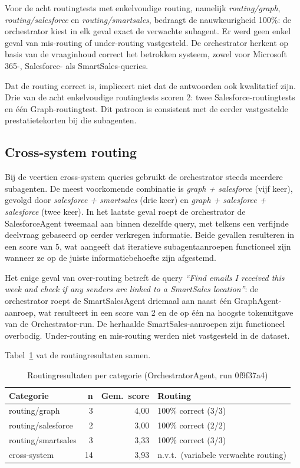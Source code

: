 Voor de acht routingtests met enkelvoudige routing, namelijk \textit{routing/graph}, \textit{routing/salesforce} en \textit{routing/smartsales}, bedraagt de nauwkeurigheid 100\%: de orchestrator kiest in elk geval exact de verwachte subagent. Er werd geen enkel geval van mis-routing of under-routing vastgesteld. De orchestrator herkent op basis van de vraaginhoud correct het betrokken systeem, zowel voor Microsoft 365-, Salesforce- als SmartSales-queries.

Dat de routing correct is, impliceert niet dat de antwoorden ook kwalitatief zijn. Drie van de acht enkelvoudige routingtests scoren 2: twee Salesforce-routingtests en één Graph-routingtest. Dit patroon is consistent met de eerder vastgestelde prestatietekorten bij die subagenten.

\subsection*{Cross-system routing}

Bij de veertien cross-system queries gebruikt de orchestrator steeds meerdere subagenten. De meest voorkomende combinatie is \textit{graph + salesforce} (vijf keer), gevolgd door \textit{salesforce + smartsales} (drie keer) en \textit{graph + salesforce + salesforce} (twee keer). In het laatste geval roept de orchestrator de SalesforceAgent tweemaal aan binnen dezelfde query, met telkens een verfijnde deelvraag gebaseerd op eerder verkregen informatie. Beide gevallen resulteren in een score van 5, wat aangeeft dat iteratieve subagentaanroepen functioneel zijn wanneer ze op de juiste informatiebehoefte zijn afgestemd.

Het enige geval van over-routing betreft de query \textit{``Find emails I received this week and check if any senders are linked to a SmartSales location''}: de orchestrator roept de SmartSalesAgent driemaal aan naast één GraphAgent-aanroep, wat resulteert in een score van 2 en de op één na hoogste tokenuitgave van de Orchestrator-run. De herhaalde SmartSales-aanroepen zijn functioneel overbodig. Under-routing en mis-routing werden niet vastgesteld in de dataset.

Tabel~\ref{tab:routing-overzicht} vat de routingresultaten samen.

\begin{table}[ht]
\centering
\caption{Routingresultaten per categorie (OrchestratorAgent, run 0f9f37a4)}
\label{tab:routing-overzicht}
\renewcommand{\arraystretch}{1.3}
\begin{tabular}{lrrl}
\hline
\textbf{Categorie} & \textbf{n} & \textbf{Gem.\ score} & \textbf{Routing} \\
\hline
routing/graph       & 3  & 4,00 & 100\% correct (3/3) \\
routing/salesforce  & 2  & 3,00 & 100\% correct (2/2) \\
routing/smartsales  & 3  & 3,33 & 100\% correct (3/3) \\
cross-system        & 14 & 3,93 & n.v.t.\ (variabele verwachte routing) \\
\hline
\end{tabular}
\end{table}

